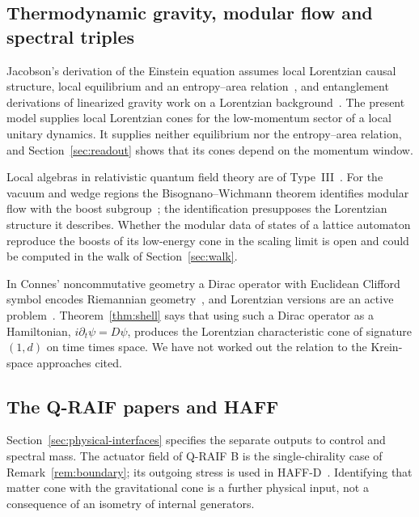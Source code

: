 \documentclass[12pt]{article}
\theoremstyle{definition}
\theoremstyle{remark}
\begin{document}
\subsection{Thermodynamic gravity, modular flow and spectral triples}

Jacobson's derivation of the Einstein equation assumes local Lorentzian causal structure, local equilibrium and an entropy--area relation~\cite{Jacobson1995}, and entanglement derivations of linearized gravity work on a Lorentzian background~\cite{Faulkner2014,Lashkari2014}. The present model supplies local Lorentzian cones for the low-momentum sector of a local unitary dynamics. It supplies neither equilibrium nor the entropy--area relation, and Section~\ref{sec:readout} shows that its cones depend on the momentum window.

Local algebras in relativistic quantum field theory are of Type~III~\cite{Haag1996,Witten2018}. For the vacuum and wedge regions the Bisognano--Wichmann theorem identifies modular flow with the boost subgroup~\cite{BisognanoWichmann1975,BisognanoWichmann1976}; the identification presupposes the Lorentzian structure it describes. Whether the modular data of states of a lattice automaton reproduce the boosts of its low-energy cone in the scaling limit is open and could be computed in the walk of Section~\ref{sec:walk}.

In Connes' noncommutative geometry a Dirac operator with Euclidean Clifford symbol encodes Riemannian geometry~\cite{Connes1994}, and Lorentzian versions are an active problem~\cite{Barrett2007,PaschkeSitarz2006,VandenDungen2016}. Theorem~\ref{thm:shell} says that using such a Dirac operator as a Hamiltonian, $i\partial_t\psi=D\psi$, produces the Lorentzian characteristic cone of signature $(1,d)$ on time times space. We have not worked out the relation to the Krein-space approaches cited.

\subsection{The Q-RAIF papers and HAFF}

Section~\ref{sec:physical-interfaces} specifies the separate outputs to
control and spectral mass. The actuator field of Q-RAIF B is the
single-chirality case of Remark~\ref{rem:boundary}; its outgoing stress
is used in HAFF-D~\cite{Liu2026HAFFD}. Identifying that matter cone with
the gravitational cone is a further physical input, not a consequence
of an isometry of internal generators.
\end{document}
